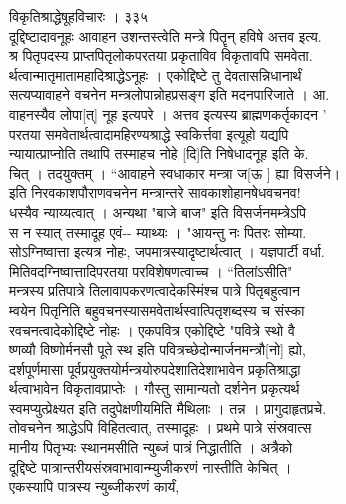\documentclass[11pt, openany]{book}
\begin{document}
{{{{{{{{{{{{{{{{{{{{{{{{{{{{{{{{{{{{{{{{{{{{{{{{{{{{{{{{{{{{{{{{{{{{{{{{{{{{{{{{{{{{{{{{{{{{{{{{{{{{{{{{{{{{{{{{{{{{{{ विकृतिश्राद्धेषूहविचारः । ३३५\\
दूद्दिष्टादावनूहः \textbar{} आवाहन उशन्तस्त्वेति मन्त्रे पितॄन् हविषे
अत्तव इत्य.\\
श्र पितृपदस्य प्राप्तपितृलोकपरतया प्रकृताविव विकृतावपि समवेता.\\
र्थत्वान्मातृमातामहादिश्राद्धेऽनूहः । एकोद्दिष्टे तु
देवतासन्निधानार्थं\\
सत्यप्यावाहने वचनेन मन्त्रलोपान्नोहप्रसङ्ग इति मदनपारिजाते । आ.\\
वाहनस्यैव लोपा{[}त्{]} नूह इत्यपरे । अत्तव इत्यस्य ब्राह्मणकर्तृकादन '\\
परतया समवेतार्थत्वादामहिरण्यश्राद्धे स्वकिर्त्तवा इत्यूहो यद्यपि\\
न्यायात्प्राप्नोति तथापि तस्माहच नोहे {[}दि{]}ति निषेधादनूह इति के.\\
चित् । तदयुक्तम् । ``आवाहने स्वधाकार मन्त्रा ज{[}ऊ {]} ह्या विसर्जने।\\
इति निरवकाशपौराणवचनेन मन्त्रान्तरे सावकाशोहानषेधवचनव!\\
धस्यैव न्याय्यत्वात् । अन्यथा "बाजे बाज" इति विसर्जनमम्त्रेऽपि\\
स न स्यात् तस्मादूह एवं-\/- म्याथ्यः । "आयन्तु नः पितरः सोम्या.\\
सोऽग्निष्वात्ता इत्यत्र नोहः, जपमात्रस्यादृष्टार्थत्वात् । यज्ञपार्टी
वर्धा.\\
मितिवदग्निष्वात्तादिपरतया परविशेषणत्वाच्च । ``तिलांऽसीति"\\
मन्त्रस्य प्रतिपात्रे तिलावापकरणत्वादेकस्मिंश्च पात्रे पितृबहुत्वान\\
म्वयेन पितृनिति बहुवचनस्यासमवेतार्थस्वात्पितृशब्दस्य च संस्का\\
रवचनत्वादेकोद्दिष्टे नोहः । एकपवित्र एकोद्दिष्टे "पवित्रे स्थो वै\\
ष्णव्यौ विष्णोर्मनसौ पूते स्थ इति पवित्रच्छेदोन्मार्जनमन्त्रौ[नो]
ह्यो,\\
दर्शपूर्णमासा पूर्वप्रयुक्तयोर्मन्त्रयोरुपदेशातिदेशाभावेन
प्रकृतिश्राद्धा\\
र्थत्वाभावेन विकृतावप्राप्तेः । गौस्तु सामान्यतो दर्शनेन प्रकृत्यर्थ\\
स्वमप्युत्प्रेक्ष्यत इति तदुपेक्षणीयमिति मैथिलाः । तन्न ।
प्रागुदाहृतप्रचे.\\
तोवचनेन श्राद्धेऽपि विहितत्वात्, तस्मादूहः । प्रथमे पात्रे संस्रवात्स\\
मानीय पितृभ्यः स्थानमसीति न्युब्जं पात्रं निद्धातीति । अत्रैको\\
दूद्दिष्टे पात्रान्तरीयसंस्रवाभावान्म्युजीकरणं नास्तीति केचित् ।\\
एकस्यापि पात्रस्य न्युब्जीकरणं कार्यं,
}}}}}}}}}}}}}}}}}}}}}}}}}}}}}}}}}}}}}}}}}}}}}}}}}}}}}}}}}}}}}}}}}}}}}}}}}}}}}}}}}}}}}}}}}}}}}}}}}}}}}}}}}}}}}}}}}}}}}}
\end{document}
